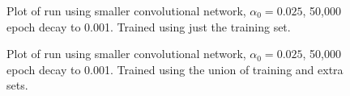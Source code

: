 \documentclass[12pt]{article}
\begin{document}
\begin{figure}
\centering
{}\hfill
{}\hfill
\caption{Plot of run using smaller convolutional network, $\alpha_0 = 0.025$, 50,000 epoch decay to 0.001. Trained using just the training set.}
\label{fig:final_lessdata}
\end{figure}

\begin{figure}
\centering
{}\hfill
{}\hfill
\caption{Plot of run using smaller convolutional network, $\alpha_0 = 0.025$, 50,000 epoch decay to 0.001. Trained using the union of training and extra sets.}
\label{fig:final_moredata}
\end{figure}
\end{document}
